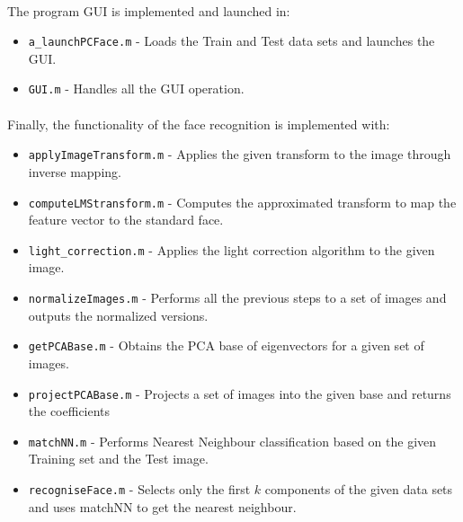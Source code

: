\documentclass[12pt,a4paper,titlepage]{article}
\begin{document}
\paragraph{}The program GUI is implemented and launched in:
\vspace{-0.5em}
\begin{itemize}[itemsep=0.05em]
	\item \texttt{a\_launchPCFace.m} - Loads the Train and Test data sets and launches the GUI.
 	\item \texttt{GUI.m} - Handles all the GUI operation.
\end{itemize}

\paragraph{}Finally, the functionality of the face recognition is implemented with:
\vspace{-0.5em}
\begin{itemize}[itemsep=0.05em]
    \item \texttt{applyImageTransform.m} - Applies the given transform to the image through inverse mapping.
	\item \texttt{computeLMStransform.m} - Computes the approximated transform to map the feature vector to the standard face.
	\item \texttt{light\_correction.m} - Applies the light correction algorithm to the given image.
	\item \texttt{normalizeImages.m} - Performs all the previous steps to a set of images and outputs the normalized versions.
	
	\item \texttt{getPCABase.m} - Obtains the PCA base of eigenvectors for a given set of images.
	\item \texttt{projectPCABase.m} - Projects a set of images into the given base and returns the coefficients
	\item \texttt{matchNN.m} - Performs Nearest Neighbour classification based on the given Training set and the Test image.
	
	\item \texttt{recogniseFace.m} - Selects only the first $k$ components of the given data sets and uses matchNN to get the nearest neighbour.
\end{itemize}
\end{document}

